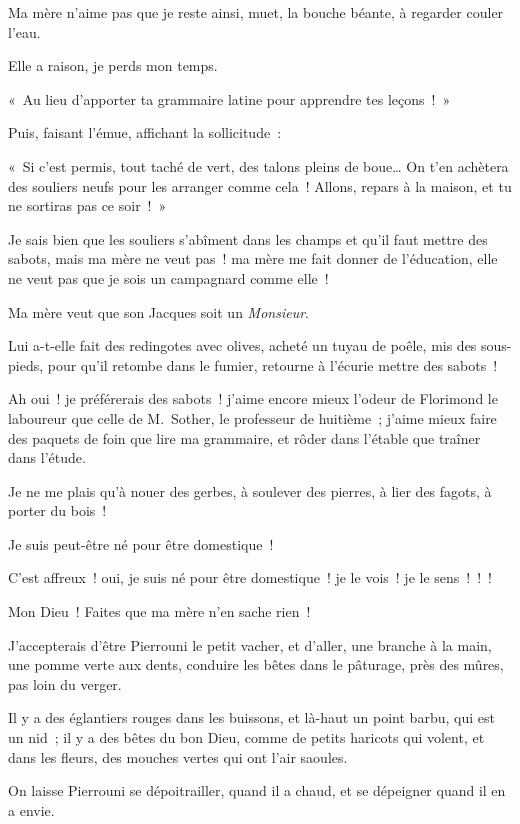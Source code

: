 \documentclass[french,twoside]{book} %
\begin{document}
Ma mère n’aime pas que je reste ainsi, muet, la bouche béante, à regarder couler l’eau.\par
Elle a raison, je perds mon temps.\par
« Au lieu d’apporter ta grammaire latine pour apprendre tes leçons ! »\par
Puis, faisant l’émue, affichant la sollicitude :\par
« Si c’est permis, tout taché de vert, des talons pleins de boue… On t’en achètera des souliers neufs pour les arranger comme cela ! Allons, repars à la maison, et tu ne sortiras pas ce soir ! »\par
Je sais bien que les souliers s’abîment dans les champs et qu’il faut mettre des sabots, mais ma mère ne veut pas ! ma mère me fait donner de l’éducation, elle ne veut pas que je sois un campagnard comme elle !\par
Ma mère veut que son Jacques soit un \emph{Monsieur}.\par
Lui a-t-elle fait des redingotes avec olives, acheté un tuyau de poêle, mis des sous-pieds, pour qu’il retombe dans le fumier, retourne à l’écurie mettre des sabots !\par
Ah oui ! je préférerais des sabots ! j’aime encore mieux l’odeur de Florimond le laboureur que celle de M. Sother, le professeur de huitième ; j’aime mieux faire des paquets de foin que lire ma grammaire, et rôder dans l’étable que traîner dans l’étude.\par
Je ne me plais qu’à nouer des gerbes, à soulever des pierres, à lier des fagots, à porter du bois !\par
Je suis peut-être né pour être domestique !\par
C’est affreux ! oui, je suis né pour être domestique ! je le vois ! je le sens ! ! !\par
Mon Dieu ! Faites que ma mère n’en sache rien !\par
J’accepterais d’être Pierrouni le petit vacher, et d’aller, une branche à la main, une pomme verte aux dents, conduire les bêtes dans le pâturage, près des mûres, pas loin du verger.\par
Il y a des églantiers rouges dans les buissons, et là-haut un point barbu, qui est un nid ; il y a des bêtes du bon Dieu, comme de petits haricots qui volent, et dans les fleurs, des mouches vertes qui ont l’air saoules.\par
On laisse Pierrouni se dépoitrailler, quand il a chaud, et se dépeigner quand il en a envie.\par
\end{document}
